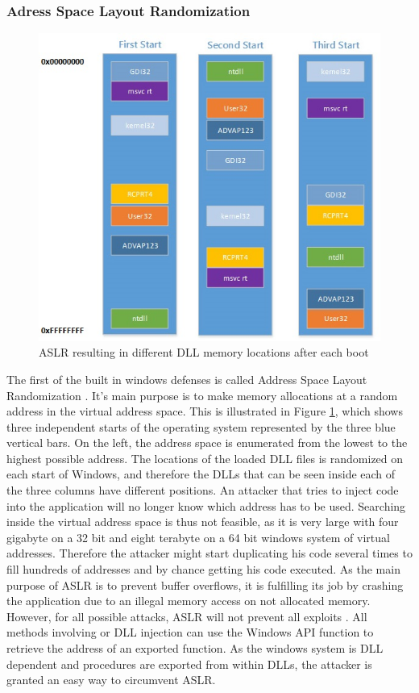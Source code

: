\subsubsection{Adress Space Layout Randomization}
\begin{figure}[h]
\centering
\includegraphics[width=\textwidth,height=\textheight,keepaspectratio]{sections/background/defenses/aslr.jpg}
\caption{ASLR resulting in different DLL memory locations after each boot}
\label{fig:aslr}
\end{figure}
The first of the built in windows defenses is called Address Space Layout Randomization \cite{miller2009method}. It's main purpose is to make memory allocations at a random address in the virtual address space. This is illustrated in Figure \ref{fig:aslr}, which shows three independent starts of the operating system represented by the three blue vertical bars. On the left, the address space is enumerated from the lowest to the highest possible address. The locations of the loaded DLL files is randomized on each start of Windows, and therefore the DLLs that can be seen inside each of the three columns have different positions. An attacker that tries to inject code into the application will no longer know which address has to be used. Searching inside the virtual address space is thus not feasible, as it is very large with four gigabyte on a 32 bit and eight terabyte on a 64 bit windows system of virtual addresses. Therefore the attacker might start duplicating his code several times to fill hundreds of addresses and by chance getting his code executed. As the main purpose of ASLR is to prevent buffer overflows, it is fulfilling its job by crashing the application due to an illegal memory access on not allocated memory. However, for all possible attacks, ASLR will not prevent all exploits \cite{shacham}. All methods involving  or DLL injection can use the Windows API function  to retrieve the address of an exported function. As the windows system is DLL dependent and procedures are exported from within DLLs, the attacker is granted an easy way to circumvent ASLR.